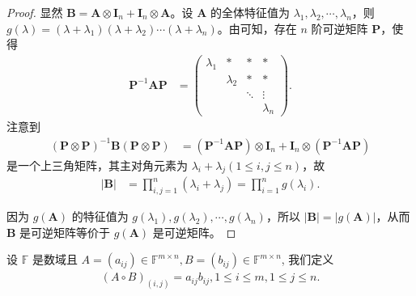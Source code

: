 \documentclass[../../main.tex]{subfiles}
\begin{document}
\begin{proof}
显然 $\boldsymbol{B} = \boldsymbol{A} \otimes \boldsymbol{I}_n + \boldsymbol{I}_n \otimes \boldsymbol{A}$。设 $\boldsymbol{A}$ 的全体特征值为 $\lambda_1, \lambda_2, \cdots, \lambda_n$，则 $g(\lambda) = (\lambda + \lambda_1)(\lambda + \lambda_2)\cdots(\lambda + \lambda_n)$。由可知，存在 $n$ 阶可逆矩阵 $\boldsymbol{P}$，使得
\begin{align*}
\boldsymbol{P}^{-1}\boldsymbol{AP} &= 
\begin{pmatrix}
\lambda_1 & * & * & * \\
 & \lambda_2 & * & * \\
 & & \ddots & \vdots \\
 & & & \lambda_n
\end{pmatrix}.
\end{align*}
注意到
\begin{align*}
(\boldsymbol{P} \otimes \boldsymbol{P})^{-1}\boldsymbol{B}(\boldsymbol{P} \otimes \boldsymbol{P}) &= (\boldsymbol{P}^{-1}\boldsymbol{AP}) \otimes \boldsymbol{I}_n + \boldsymbol{I}_n \otimes (\boldsymbol{P}^{-1}\boldsymbol{AP})
\end{align*}
是一个上三角矩阵，其主对角元素为 $\lambda_i + \lambda_j (1 \leqslant  i, j \leqslant  n)$，故
\begin{align*}
|\boldsymbol{B}| &= \prod_{i,j = 1}^{n} (\lambda_i + \lambda_j) = \prod_{i = 1}^{n} g(\lambda_i).
\end{align*}

因为 $g(\boldsymbol{A})$ 的特征值为 $g(\lambda_1), g(\lambda_2), \cdots, g(\lambda_n)$，所以 $|\boldsymbol{B}| = |g(\boldsymbol{A})|$，从而 $\boldsymbol{B}$ 是可逆矩阵等价于 $g(\boldsymbol{A})$ 是可逆矩阵。

\end{proof}

\begin{definition}[矩阵的Hadamard积]
设 $\mathbb{F}$ 是数域且 $A=(a_{ij})\in\mathbb{F}^{m\times n}, B=(b_{ij})\in\mathbb{F}^{m\times n}$, 我们定义
\begin{align*}
(A\circ B)_{(i,j)}=a_{ij}b_{ij}, 1\leqslant i\leqslant m, 1\leqslant j\leqslant n.
\end{align*}
\end{definition}
\end{document}
